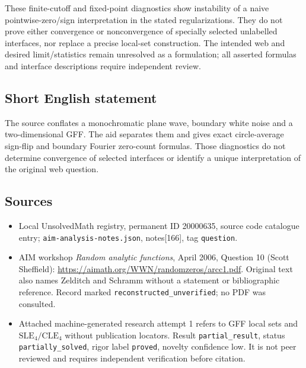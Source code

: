\documentclass[11pt]{article}
\begin{document}
These finite-cutoff and fixed-point diagnostics show instability of a naive pointwise-zero/sign interpretation in the stated regularizations. They do not prove either convergence or nonconvergence of specially selected unlabelled interfaces, nor replace a precise local-set construction. The intended web and desired limit/statistics remain unresolved as a formulation; all asserted formulas and interface descriptions require independent review.
\subsection{Short English statement}
The source conflates a monochromatic plane wave, boundary white noise and a two-dimensional GFF. The aid separates them and gives exact circle-average sign-flip and boundary Fourier zero-count formulas. Those diagnostics do not determine convergence of selected interfaces or identify a unique interpretation of the original web question.
\subsection{Sources}
\begin{itemize}
\item Local UnsolvedMath registry, permanent ID 20000635, source code catalogue entry; \texttt{aim-analysis-notes.json}, notes[166], tag \texttt{question}.
\item AIM workshop \emph{Random analytic functions}, April 2006, Question 10 (Scott Sheffield): \url{https://aimath.org/WWN/randomzeros/arcc1.pdf}. Original text also names Zelditch and Schramm without a statement or bibliographic reference. Record marked \texttt{reconstructed\_unverified}; no PDF was consulted.
\item Attached machine-generated research attempt 1 refers to GFF local sets and $\mathrm{SLE}_4/\mathrm{CLE}_4$ without publication locators. Result \texttt{partial\_result}, status \texttt{partially\_solved}, rigor label \texttt{proved}, novelty confidence low. It is not peer reviewed and requires independent verification before citation.
\end{itemize}
\end{document}
